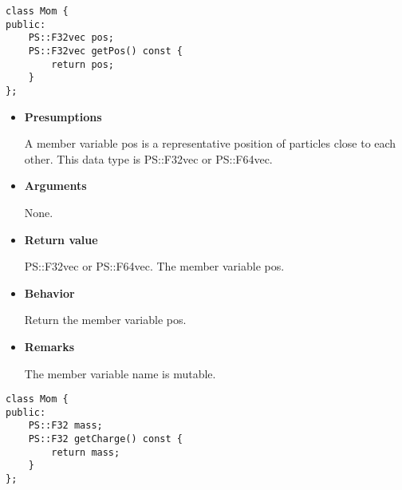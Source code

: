 
\begin{screen}
\begin{verbatim}
class Mom {
public:
    PS::F32vec pos;
    PS::F32vec getPos() const {
        return pos;
    }
};
\end{verbatim}
\end{screen}

\begin{itemize}

\item {\bf Presumptions}

  A member variable pos is a representative position of particles
  close to each other. This data type is PS::F32vec or PS::F64vec.
  
\item {\bf Arguments}

  None.
  
\item {\bf Return value}

  PS::F32vec or PS::F64vec. The member variable pos.

\item {\bf Behavior}

  Return the member variable pos.
  
\item {\bf Remarks}

  The member variable name is mutable.

\end{itemize}


\begin{screen}
\begin{verbatim}
class Mom {
public:
    PS::F32 mass;
    PS::F32 getCharge() const {
        return mass;
    }
};
\end{verbatim}
\end{screen}

